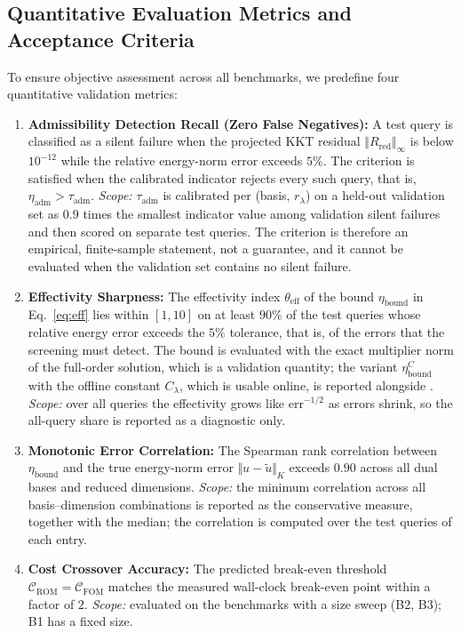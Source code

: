 \documentclass[11pt,a4paper]{article}
\providecommand{\tightlist}{\setlength{\itemsep}{0pt}\setlength{\parskip}{0pt}}
\begin{document}
\hypertarget{quantitative-evaluation-metrics-and-acceptance-criteria}{%
\subsection{Quantitative Evaluation Metrics and Acceptance Criteria}\label{quantitative-evaluation-metrics-and-acceptance-criteria}}

To ensure objective assessment across all benchmarks, we predefine four quantitative validation metrics:
\begin{enumerate}
\tightlist
\item \textbf{Admissibility Detection Recall (Zero False Negatives):} A test query is classified as a silent failure when the projected KKT residual \(\Vert R_{\text{red}}\Vert_\infty\) is below \(10^{-12}\) while the relative energy-norm error exceeds \(5\%\). The criterion is satisfied when the calibrated indicator rejects every such query, that is, \(\eta_{\text{adm}} > \tau_{\text{adm}}\). \emph{Scope:} \(\tau_{\text{adm}}\) is calibrated per (basis, \(r_\lambda\)) on a held-out validation set as \(0.9\) times the smallest indicator value among validation silent failures and then scored on separate test queries. The criterion is therefore an empirical, finite-sample statement, not a guarantee, and it cannot be evaluated when the validation set contains no silent failure.
\item \textbf{Effectivity Sharpness:} The effectivity index \(\theta_{\text{eff}}\) of the bound \(\eta_{\text{bound}}\) in Eq.~\eqref{eq:eff} lies within \([1, 10]\) on at least \(90\%\) of the test queries whose relative energy error exceeds the \(5\%\) tolerance, that is, of the errors that the screening must detect. The bound is evaluated with the exact multiplier norm of the full-order solution, which is a validation quantity; the variant \(\eta_{\text{bound}}^{C}\) with the offline constant \(C_\lambda\), which is usable online, is reported alongside \cite{hild2007residual, benaceur2020reduced, fontana2024guaranteed}. \emph{Scope:} over all queries the effectivity grows like \(\text{err}^{-1/2}\) as errors shrink, so the all-query share is reported as a diagnostic only.
\item \textbf{Monotonic Error Correlation:} The Spearman rank correlation between \(\eta_{\text{bound}}\) and the true energy-norm error \(\Vert u - \tilde{u}\Vert_K\) exceeds \(0.90\) across all dual bases and reduced dimensions. \emph{Scope:} the minimum correlation across all basis--dimension combinations is reported as the conservative measure, together with the median; the correlation is computed over the test queries of each entry.
\item \textbf{Cost Crossover Accuracy:} The predicted break-even threshold \(\mathcal{C}_{\text{ROM}} = \mathcal{C}_{\text{FOM}}\) matches the measured wall-clock break-even point within a factor of \(2\). \emph{Scope:} evaluated on the benchmarks with a size sweep (B2, B3); B1 has a fixed size.
\end{enumerate}
\end{document}
